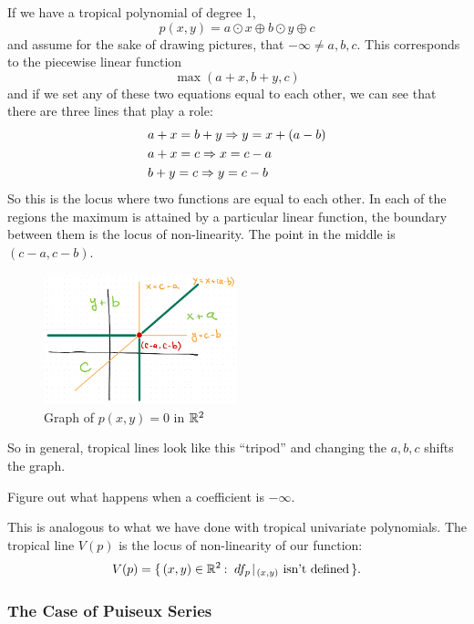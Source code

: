 \documentclass[12pt]{memoir}
\theoremstyle{definition}
\begin{document}
If we have a tropical polynomial of degree 1, 
$$p(x,y)=a\odot x\oplus b\odot y\oplus c$$
and assume for the sake of drawing pictures, that $-\infty\neq a,b,c$. This corresponds to the piecewise linear function 
$$\max(a+x,b+y,c)$$
and if we set any of these two equations equal to each other, we can see that there are three lines that play a role:
\begin{align*}
    &a+x=b+y\Rightarrow y=x+(a-b)\\
    &a+x=c\Rightarrow x=c-a\\
    &b+y=c\Rightarrow y=c-b
\end{align*}
So this is the locus where two functions are equal to each other. In each of the regions the maximum is attained by a particular linear function, the boundary between them is the locus of non-linearity. The point in the middle is $(c-a,c-b)$. 

\begin{figure}[h!]
    \centering
    \includegraphics[width=0.5\textwidth]{figs/fig7-1-TropicalLineExample.png}
    \caption{Graph of $p(x,y)=0$ in $\mathbb{R}^2$}
    \label{fig:7.1-TropicalLineExample}
\end{figure}

So in general, tropical lines look like this ``tripod'' and changing the $a,b,c$ shifts the graph. 

\begin{Ej}[2]
Figure out what happens when a coefficient is $-\infty$.
\end{Ej}

This is analogous to what we have done with tropical univariate polynomials. The tropical line $V(p)$ is the locus of non-linearity of our function:
$$V(p)=\set{(x,y)\in\bR^2\:\ df_p\!\mid\!_{(x,y)}\text{ isn't defined}}.$$
\subsubsection{The Case of Puiseux Series}
\end{document}
